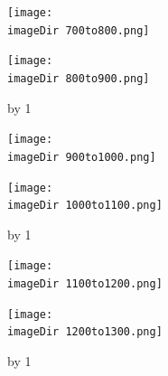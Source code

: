 \documentclass[twoside]{article}
\begin{document}
\begin{figure}[H]
 \centering
 \newcount\row
\begin{minipage}[b]{0.4\textwidth}
    \centering
    \texttt{[image: \\imageDir 700to800.png]}
\end{minipage}%
\begin{minipage}[b]{0.4\textwidth}
    \centering
    \texttt{[image: \\imageDir 800to900.png]}
\end{minipage}
\vskip 0.5cm
\advance\row by 1

\begin{minipage}[b]{0.4\textwidth}
    \centering
    \texttt{[image: \\imageDir 900to1000.png]}
\end{minipage}%
\begin{minipage}[b]{0.4\textwidth}
    \centering
    \texttt{[image: \\imageDir 1000to1100.png]}
\end{minipage}
\vskip 0.5cm
\advance\row by 1

\begin{minipage}[b]{0.4\textwidth}
    \centering
    \texttt{[image: \\imageDir 1100to1200.png]}
\end{minipage}%
\begin{minipage}[b]{0.4\textwidth}
    \centering
    \texttt{[image: \\imageDir 1200to1300.png]}
\end{minipage}
\vskip 0.5cm
\advance\row by 1
\end{figure}
\end{document}
